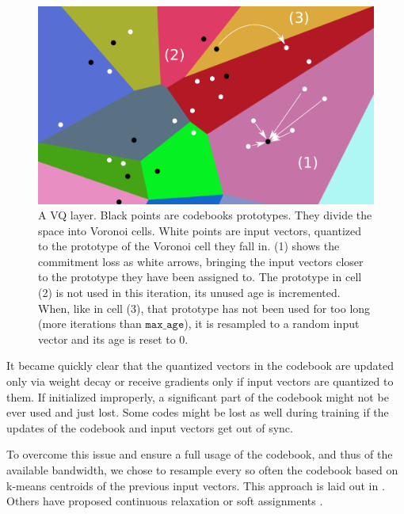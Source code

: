 \begin{figure}[ht]
    \centering
    \includegraphics[scale=0.5]{60-files/vq.pdf}
    \caption{A VQ layer. Black points are codebooks prototypes. They divide the space into Voronoi cells. White points are input vectors, quantized to the prototype of the Voronoi cell they fall in. (1) shows the commitment loss as white arrows, bringing the input vectors closer to the prototype they have been assigned to. The prototype in cell (2) is not used in this iteration, its unused age is incremented. When, like in cell (3), that prototype has not been used for too long (more iterations than $\texttt{max\_age}$), it is resampled to a random input vector and its age is reset to 0. }
    \label{fig:vq-resample}
\end{figure}

It became quickly clear that the quantized vectors in the codebook are updated only via weight decay or receive gradients only if input vectors are quantized to them. If initialized improperly, a significant part of the codebook might not be ever used and just lost. Some codes might be lost as well during training if the updates of the codebook and input vectors get out of sync.

To overcome this issue and ensure a full usage of the codebook, and thus of the available bandwidth, we chose to resample every so often the codebook based on k-means centroids of the previous input vectors. This approach is laid out in \citet{robustvq}. Others have proposed continuous relaxation \citep{continuousvq} or soft assignments \citep{softvq}.

